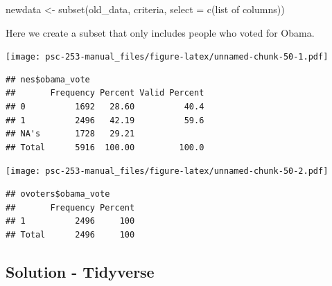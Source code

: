 \documentclass[
]{book}
\newenvironment{Shaded}{\begin{snugshade}}{\end{snugshade}}
\newcommand{\AttributeTok}[1]{\textcolor[rgb]{0.77,0.63,0.00}{#1}}
\newcommand{\CommentTok}[1]{\textcolor[rgb]{0.56,0.35,0.01}{\textit{#1}}}
\newcommand{\DecValTok}[1]{\textcolor[rgb]{0.00,0.00,0.81}{#1}}
\newcommand{\FunctionTok}[1]{\textcolor[rgb]{0.00,0.00,0.00}{#1}}
\newcommand{\NormalTok}[1]{#1}
\newcommand{\OtherTok}[1]{\textcolor[rgb]{0.56,0.35,0.01}{#1}}
\newcommand{\SpecialCharTok}[1]{\textcolor[rgb]{0.00,0.00,0.00}{#1}}
\begin{document}
\begin{Shaded}
\begin{Highlighting}[]
\NormalTok{newdata }\OtherTok{\textless{}{-}} \FunctionTok{subset}\NormalTok{(old\_data, criteria, }\AttributeTok{select =} \FunctionTok{c}\NormalTok{(list of columns))}
\end{Highlighting}
\end{Shaded}

Here we create a subset that only includes people who voted for Obama.

\begin{Shaded}
\end{Shaded}

\texttt{[image: psc-253-manual\_files/figure-latex/unnamed-chunk-50-1.pdf]}

\begin{verbatim}
## nes$obama_vote 
##       Frequency Percent Valid Percent
## 0          1692   28.60          40.4
## 1          2496   42.19          59.6
## NA's       1728   29.21              
## Total      5916  100.00         100.0
\end{verbatim}

\begin{Shaded}
\end{Shaded}

\texttt{[image: psc-253-manual\_files/figure-latex/unnamed-chunk-50-2.pdf]}

\begin{verbatim}
## ovoters$obama_vote 
##       Frequency Percent
## 1          2496     100
## Total      2496     100
\end{verbatim}

\hypertarget{solution---tidyverse}{%
\subsection{Solution - Tidyverse}\label{solution---tidyverse}}
\end{document}
